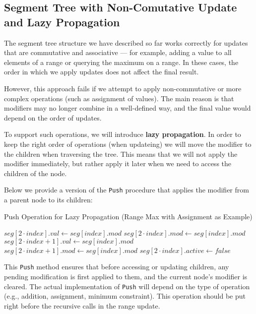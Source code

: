 \documentclass[11pt]{article}
\begin{document}
\subsection{Segment Tree with Non-Comutative Update and Lazy Propagation}

The segment tree structure we have described so far works correctly for updates that are commutative and associative --- for example, adding a value to all elements of a range or querying the maximum on a range. In these cases, the order in which we apply updates does not affect the final result.

However, this approach fails if we attempt to apply non-commutative or more complex operations (such as assignment of values). The main reason is that modifiers may no longer combine in a well-defined way, and the final value would depend on the order of updates.

To support such operations, we will introduce \textbf{lazy propagation}.
In order to keep the right order of operations (when updateing) we will move the modifier to the children when traversing the tree.
This means that we will not apply the modifier immediately, but rather apply it later when we need to access the children of the node.




\vspace{1em}

\noindent Below we provide a version of the \texttt{Push} procedure that applies the modifier from a parent node to its children:

\begin{algorithm}[H]
    \caption{Push Operation for Lazy Propagation (Range Max with Assignment as Example)}
    \begin{algorithmic}
             
                \State $seg[2 \cdot index].val \gets seg[index].mod$
                \State $seg[2 \cdot index].mod \gets  seg[index].mod$
                \State $seg[2 \cdot index + 1].val \gets  seg[index].mod$
                \State $seg[2 \cdot index + 1].mod \gets  seg[index].mod$
                \State $seg[2 \cdot index].active \gets false$
            \EndIf
        \EndProcedure
    \end{algorithmic}
\end{algorithm}

\noindent
This \texttt{Push} method ensures that before accessing or updating children, any pending modification is first applied to them, and the current node's modifier is cleared. The actual implementation of \texttt{Push} will depend on the type of operation (e.g., addition, assignment, minimum constraint).
This operation should be put right before the recursive calls in the range update.
\end{document}
